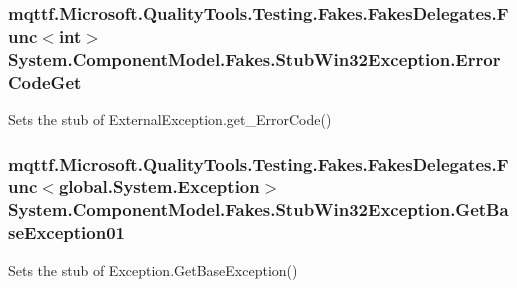 \hypertarget{class_system_1_1_component_model_1_1_fakes_1_1_stub_win32_exception_a6d307b4be488d527f346d389d18d7d8c}{
\subsubsection[{Error\-Code\-Get}]{\setlength{\rightskip}{0pt plus 5cm}mqttf.\-Microsoft.\-Quality\-Tools.\-Testing.\-Fakes.\-Fakes\-Delegates.\-Func$<$int$>$ System.\-Component\-Model.\-Fakes.\-Stub\-Win32\-Exception.\-Error\-Code\-Get}}\label{class_system_1_1_component_model_1_1_fakes_1_1_stub_win32_exception_a6d307b4be488d527f346d389d18d7d8c}


Sets the stub of External\-Exception.\-get\-\_\-\-Error\-Code()

\hypertarget{class_system_1_1_component_model_1_1_fakes_1_1_stub_win32_exception_a07d314d55173a18e4de4f1585e468c4c}{
\subsubsection[{Get\-Base\-Exception01}]{\setlength{\rightskip}{0pt plus 5cm}mqttf.\-Microsoft.\-Quality\-Tools.\-Testing.\-Fakes.\-Fakes\-Delegates.\-Func$<$global.\-System.\-Exception$>$ System.\-Component\-Model.\-Fakes.\-Stub\-Win32\-Exception.\-Get\-Base\-Exception01}}\label{class_system_1_1_component_model_1_1_fakes_1_1_stub_win32_exception_a07d314d55173a18e4de4f1585e468c4c}


Sets the stub of Exception.\-Get\-Base\-Exception()


